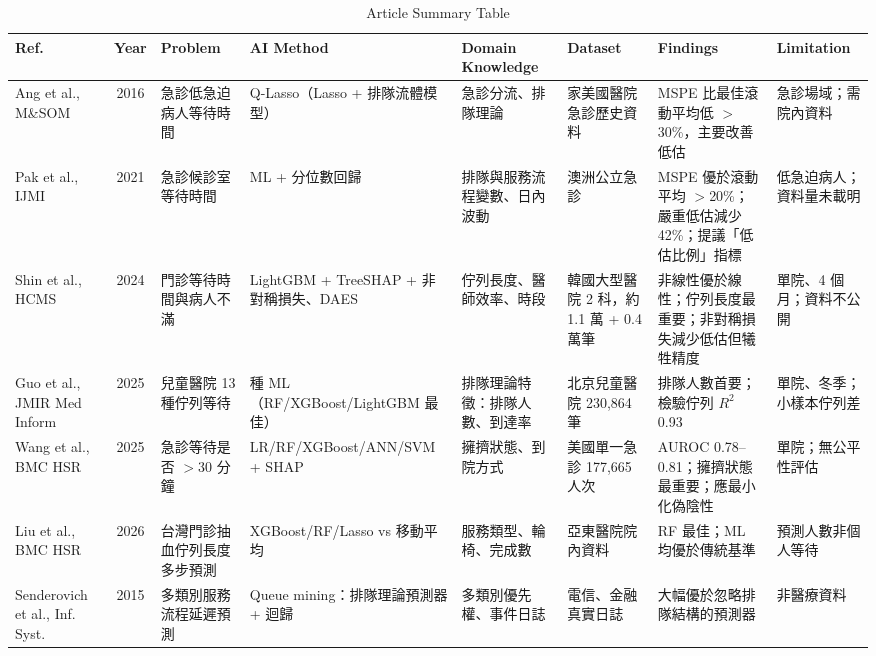 \documentclass[11pt,twocolumn]{article}
\begin{document}
\begin{table}[!t]
\centering\linespread{1.0}\selectfont\scriptsize
\caption{Article Summary Table}
\label{tab:summary}
\setlength{\tabcolsep}{3.5pt}
\renewcommand{\arraystretch}{1.15}
\begin{tabularx}{\textwidth}{@{}>{\raggedright\arraybackslash}p{1.55cm} c >{\raggedright\arraybackslash}p{2.1cm} >{\raggedright\arraybackslash}p{2.6cm} >{\raggedright\arraybackslash}p{2.2cm} >{\raggedright\arraybackslash}p{2.2cm} >{\raggedright\arraybackslash}X >{\raggedright\arraybackslash}p{2.3cm}@{}}
\toprule
\textbf{Ref.} & \textbf{Year} & \textbf{Problem} & \textbf{AI Method} & \textbf{Domain Knowledge} & \textbf{Dataset} & \textbf{Findings} & \textbf{Limitation}\\
\midrule
\cite{ang2016} Ang et al., M\&SOM & 2016 & 急診低急迫病人等待時間 & Q-Lasso（Lasso + 排隊流體模型） & 急診分流、排隊理論 & 4 家美國醫院急診歷史資料 & MSPE 比最佳滾動平均低 $>$30\%，主要改善低估 & 急診場域；需院內資料\\
\cite{pak2021} Pak et al., IJMI & 2021 & 急診候診室等待時間 & ML + 分位數回歸 & 排隊與服務流程變數、日內波動 & 澳洲公立急診 & MSPE 優於滾動平均 $>$20\%；嚴重低估減少 42\%；提議「低估比例」指標 & 低急迫病人；資料量未載明\\
\cite{shin2024} Shin et al., HCMS & 2024 & 門診等待時間與病人不滿 & LightGBM + TreeSHAP + 非對稱損失、DAES & 佇列長度、醫師效率、時段 & 韓國大型醫院 2 科，約 1.1 萬 + 0.4 萬筆 & 非線性優於線性；佇列長度最重要；非對稱損失減少低估但犧牲精度 & 單院、4 個月；資料不公開\\
\cite{guo2025} Guo et al., JMIR Med Inform & 2025 & 兒童醫院 13 種佇列等待 & 9 種 ML（RF/XGBoost/LightGBM 最佳） & 排隊理論特徵：排隊人數、到達率 & 北京兒童醫院 230,864 筆 & 排隊人數首要；檢驗佇列 $R^2$ 0.93 & 單院、冬季；小樣本佇列差\\
\cite{wang2025} Wang et al., BMC HSR & 2025 & 急診等待是否 $>$30 分鐘 & LR/RF/XGBoost/ANN/SVM + SHAP & 擁擠狀態、到院方式 & 美國單一急診 177,665 人次 & AUROC 0.78--0.81；擁擠狀態最重要；應最小化偽陰性 & 單院；無公平性評估\\
\cite{liu2026} Liu et al., BMC HSR & 2026 & 台灣門診抽血佇列長度多步預測 & XGBoost/RF/Lasso vs 移動平均 & 服務類型、輪椅、完成數 & 亞東醫院院內資料 & RF 最佳；ML 均優於傳統基準 & 預測人數非個人等待\\
\cite{senderovich2015} Senderovich et al., Inf. Syst. & 2015 & 多類別服務流程延遲預測 & Queue mining：排隊理論預測器 + 迴歸 & 多類別優先權、事件日誌 & 電信、金融真實日誌 & 大幅優於忽略排隊結構的預測器 & 非醫療資料\\

\end{tabularx}
\end{table}
\end{document}
